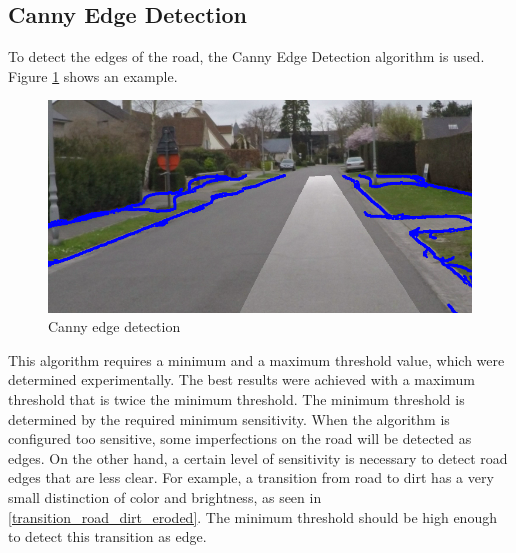 \documentclass[runningheads,a4paper]{llncs}
\begin{document}
\subsection{Canny Edge Detection}

To detect the edges of the road, the Canny Edge Detection algorithm is used. Figure \ref{canny_edges} shows an example. 


\begin{figure}[ht]
	\centering
	\includegraphics[width=.5\textwidth]{fig/canny_edges.png}
	\caption{Canny edge detection\label{canny_edges}}
\end{figure}

This algorithm requires a minimum and a maximum threshold value, which were determined experimentally. 
The best results were achieved with a maximum threshold that is twice the minimum threshold.
The minimum threshold is determined by the required minimum sensitivity. When the algorithm is configured too sensitive, some imperfections on the road will be detected as edges. On the other hand, a certain level of sensitivity is necessary to detect road edges that are  less clear. For example, a transition from road to dirt has a very small distinction of color and brightness, as seen in \ref{transition_road_dirt_eroded}. The minimum threshold should be high enough to detect this transition as edge. 
\end{document}
